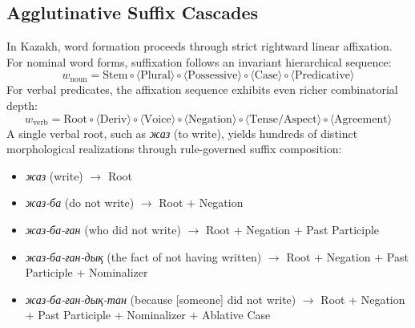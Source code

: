 \subsection{Agglutinative Suffix Cascades}
In Kazakh, word formation proceeds through strict rightward linear affixation. For nominal word forms, suffixation follows an invariant hierarchical sequence:
\begin{equation}
\label{eq:intro_nominal_order}
w_{\text{noun}} = \text{Stem} \circ \langle\text{Plural}\rangle \circ \langle\text{Possessive}\rangle \circ \langle\text{Case}\rangle \circ \langle\text{Predicative}\rangle
\end{equation}
For verbal predicates, the affixation sequence exhibits even richer combinatorial depth:
\begin{equation}
\label{eq:intro_verbal_order}
w_{\text{verb}} = \text{Root} \circ \langle\text{Deriv}\rangle \circ \langle\text{Voice}\rangle \circ \langle\text{Negation}\rangle \circ \langle\text{Tense/Aspect}\rangle \circ \langle\text{Agreement}\rangle
\end{equation}
A single verbal root, such as \textit{жаз} (to write), yields hundreds of distinct morphological realizations through rule-governed suffix composition:
\begin{itemize}
    \item \textit{жаз} (write) $\rightarrow$ Root
    \item \textit{жаз-ба} (do not write) $\rightarrow$ Root + Negation
    \item \textit{жаз-ба-ған} (who did not write) $\rightarrow$ Root + Negation + Past Participle
    \item \textit{жаз-ба-ған-дық} (the fact of not having written) $\rightarrow$ Root + Negation + Past Participle + Nominalizer
    \item \textit{жаз-ба-ған-дық-тан} (because [someone] did not write) $\rightarrow$ Root + Negation + Past Participle + Nominalizer + Ablative Case
\end{itemize}


